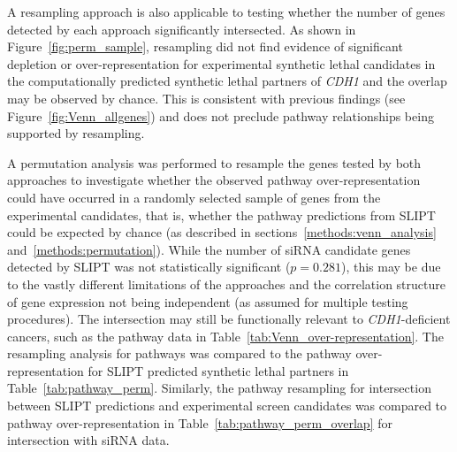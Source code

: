 A resampling approach is also applicable to testing whether the number of genes detected by each approach significantly intersected. As shown in Figure~\ref{fig:perm_sample}, resampling did not find evidence of significant depletion or over-represent\-ation for experimental synthetic lethal candidates in the computationally predicted synthetic lethal partners of \textit{CDH1} and the overlap may be observed by chance. This is consistent with previous findings (see Figure~\ref{fig:Venn_allgenes}) and does not preclude pathway relationships being supported by resampling.

A permutation analysis was performed to resample the genes tested by both approaches to investigate whether the observed pathway over-represent\-ation could have occurred in a randomly selected sample of genes from the experimental candidates, that is, whether the pathway predictions from SLIPT could be expected by chance (as described in sections~\ref{methods:venn_analysis} and~\ref{methods:permutation}).
While the number of siRNA candidate genes detected by SLIPT was not statistically significant ($p=0.281$), this may be due to the vastly different limitations of the approaches and the correlation structure of gene expression not being independent (as assumed for multiple testing procedures). The  intersection may still be functionally relevant to \textit{CDH1}-deficient cancers, such as the pathway data in Table~\ref{tab:Venn_over-representation}. The resampling analysis for pathways was compared to the pathway over-represent\-ation for SLIPT predicted synthetic lethal partners in Table~\ref{tab:pathway_perm}. Similarly, the pathway resampling for intersection between SLIPT predictions and experimental screen candidates was compared to pathway over-represent\-ation in Table~\ref{tab:pathway_perm_overlap} for intersection with siRNA data.

